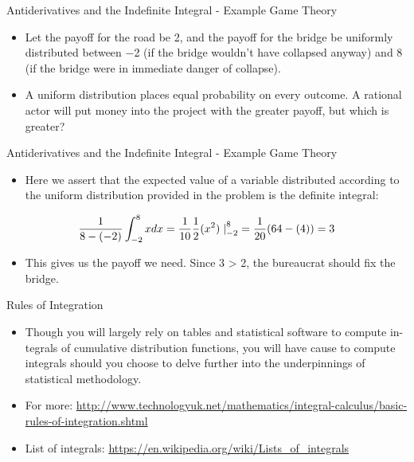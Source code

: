 \documentclass[
  ignorenonframetext,
]{beamer}
\providecommand{\tightlist}{%
  \setlength{\itemsep}{0pt}\setlength{\parskip}{0pt}}
\begin{document}
\begin{frame}{Antiderivatives and the Indefinite Integral - Example Game
Theory}
\protect\hypertarget{antiderivatives-and-the-indefinite-integral---example-game-theory-1}{}

\begin{itemize}
\item
  Let the payoff for the road be 2, and the payoff for the bridge be
  uniformly distributed between −2 (if the bridge wouldn't have
  collapsed anyway) and 8 (if the bridge were in immediate danger of
  collapse).
\item
  A uniform distribution places equal probability on every outcome. A
  rational actor will put money into the project with the greater
  payoff, but which is greater?
\end{itemize}

\end{frame}

\begin{frame}{Antiderivatives and the Indefinite Integral - Example Game
Theory}
\protect\hypertarget{antiderivatives-and-the-indefinite-integral---example-game-theory-2}{}

\begin{itemize}
\tightlist
\item
  Here we assert that the expected value of a variable distributed
  according to the uniform distribution provided in the problem is the
  definite integral:
\end{itemize}

\[\frac{1}{8-(-2)}\int_{-2}^{8}xdx = \\
\frac{1}{10}\frac{1}{2}(x^{2}) \left.\right|_{-2}^{8} = \\
\frac{1}{20}(64-(4))=3\]

\begin{itemize}
\tightlist
\item
  This gives us the payoff we need. Since 3 \textgreater{} 2, the
  bureaucrat should fix the bridge.
\end{itemize}

\end{frame}

\begin{frame}{Rules of Integration}
\protect\hypertarget{rules-of-integration}{}

\begin{itemize}
\item
  Though you will largely rely on tables and statistical software to
  compute in- tegrals of cumulative distribution functions, you will
  have cause to compute integrals should you choose to delve further
  into the underpinnings of statistical methodology.
\item
  For more:
  \url{http://www.technologyuk.net/mathematics/integral-calculus/basic-rules-of-integration.shtml}
\item
  List of integrals:
  \url{https://en.wikipedia.org/wiki/Lists_of_integrals}
\end{itemize}

\end{frame}
\end{document}
